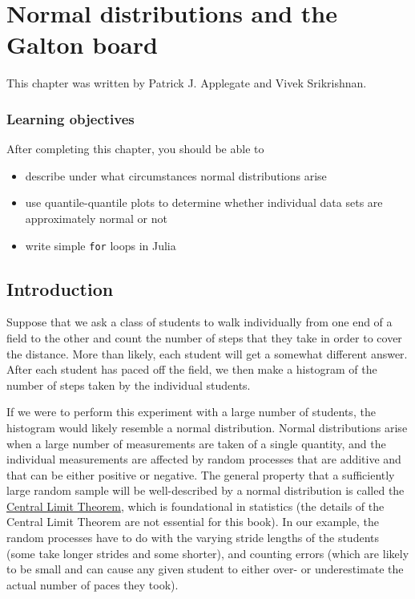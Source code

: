 \documentclass[
  11pt,
]{book}
\providecommand{\tightlist}{%
  \setlength{\itemsep}{0pt}\setlength{\parskip}{0pt}}
\begin{document}
\hypertarget{normal-distributions-and-the-galton-board}{%
\chapter{Normal distributions and the Galton board}\label{normal-distributions-and-the-galton-board}}

This chapter was written by Patrick J. Applegate and Vivek Srikrishnan.

\hypertarget{learning-objectives-2}{%
\subsection*{Learning objectives}\label{learning-objectives-2}}


After completing this chapter, you should be able to

\begin{itemize}
\tightlist
\item
  describe under what circumstances normal distributions arise
\item
  use quantile-quantile plots to determine whether individual data sets are approximately normal or not
\item
  write simple \texttt{for} loops in Julia
\end{itemize}

\hypertarget{introduction-3}{%
\section{Introduction}\label{introduction-3}}

Suppose that we ask a class of students to walk individually from one end of a field to the other and count the number of steps that they take in order to cover the distance. More than likely, each student will get a somewhat different answer. After each student has paced off the field, we then make a histogram of the number of steps taken by the individual students.

If we were to perform this experiment with a large number of students, the histogram would likely resemble a normal distribution. Normal distributions arise when a large number of measurements are taken of a single quantity, and the individual measurements are affected by random processes that are additive and that can be either positive or negative. The general property that a sufficiently large random sample will be well-described by a normal distribution is called the \href{https://en.wikipedia.org/wiki/Central_limit_theorem}{Central Limit Theorem}, which is foundational in statistics (the details of the Central Limit Theorem are not essential for this book). In our example, the random processes have to do with the varying stride lengths of the students (some take longer strides and some shorter), and counting errors (which are likely to be small and can cause any given student to either over- or underestimate the actual number of paces they took).
\end{document}
